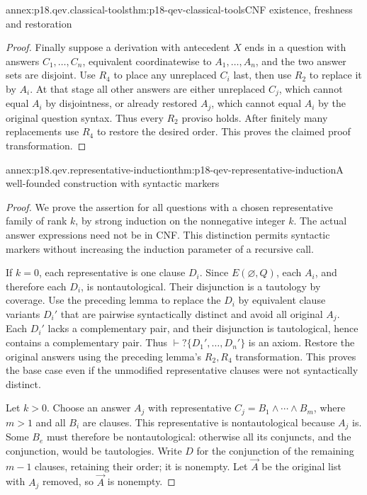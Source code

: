\begin{annexitem}{annex:p18.qev.classical-tools}{thm:p18-qev-classical-tools}{CNF existence, freshness and restoration}
\begin{proof}
Finally suppose a derivation with antecedent \(X\) ends in a
question with answers \(C_1,\ldots,C_n\), equivalent coordinatewise
to \(A_1,\ldots,A_n\), and the two answer sets are disjoint.
Use \(R_4\) to place any unreplaced \(C_i\) last, then use
\(R_2\) to replace it by \(A_i\). At that stage all other answers
are either unreplaced \(C_j\), which cannot equal \(A_i\) by
disjointness, or already restored \(A_j\), which cannot equal
\(A_i\) by the original question syntax. Thus every \(R_2\)
proviso holds. After finitely many replacements use \(R_4\) to
restore the desired order. This proves the claimed proof transformation.
\end{proof}
\end{annexitem}

\begin{annexitem}{annex:p18.qev.representative-induction}{thm:p18-qev-representative-induction}{A well-founded construction with syntactic markers}
\begin{proof}
We prove the assertion for all questions with a chosen representative
family of rank \(k\), by strong induction on the nonnegative integer
\(k\). The actual answer expressions need not be in CNF. This
distinction permits syntactic markers without increasing the induction
parameter of a recursive call.

If \(k=0\), each representative is one clause \(D_i\). Since
\(E(\varnothing,Q)\), each \(A_i\), and therefore each
\(D_i\), is nontautological. Their disjunction is a tautology by
coverage. Use the preceding lemma to replace the \(D_i\) by
equivalent clause variants \(D_i'\) that are pairwise syntactically
distinct and avoid all original \(A_j\). Each \(D_i'\) lacks a
complementary pair, and their disjunction is tautological, hence contains
a complementary pair. Thus \(\vdash?\{D_1',\ldots,D_n'\}\)
is an axiom. Restore the original answers using the preceding lemma's
\(R_2,R_4\) transformation. This proves the base case even if
the unmodified representative clauses were not syntactically distinct.

Let \(k>0\). Choose an answer \(A_j\) with representative
\(C_j=B_1\land\cdots\land B_m\), where \(m>1\) and all
\(B_i\) are clauses. This representative is nontautological because
\(A_j\) is. Some \(B_e\) must therefore be nontautological:
otherwise all its conjuncts, and the conjunction, would be tautologies.
Write \(D\) for the conjunction of the remaining \(m-1\) clauses,
retaining their order; it is nonempty. Let \(\vec A\) be the
original list with \(A_j\) removed, so \(\vec A\) is nonempty.


\end{proof}
\end{annexitem}
